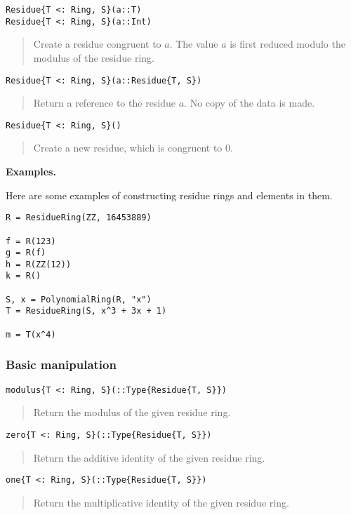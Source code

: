 \documentclass[a4paper,10pt]{article}
\newcommand{\desc}[1]{\vspace{-3mm}\begin{quote}#1\end{quote}}
\begin{document}
{{{\begin{lstlisting}
Residue{T <: Ring, S}(a::T)
Residue{T <: Ring, S}(a::Int)  
\end{lstlisting}

\desc{Create a residue congruent to $a$. The value $a$ is first reduced
modulo the modulus of the residue ring.}

\begin{lstlisting}
Residue{T <: Ring, S}(a::Residue{T, S})  
\end{lstlisting}

\desc{Return a reference to the residue $a$. No copy of the data is made.}

\begin{lstlisting}
Residue{T <: Ring, S}()
\end{lstlisting}

\desc{Create a new residue, which is congruent to $0$.}

\textbf{Examples.}

Here are some examples of constructing residue rings and elements in them.

\begin{lstlisting}
R = ResidueRing(ZZ, 16453889)

f = R(123)
g = R(f)
h = R(ZZ(12))
k = R()

S, x = PolynomialRing(R, "x")
T = ResidueRing(S, x^3 + 3x + 1)

m = T(x^4)
\end{lstlisting}

\subsubsection{Basic manipulation}

\begin{lstlisting}
modulus{T <: Ring, S}(::Type{Residue{T, S}})
\end{lstlisting}

\desc{Return the modulus of the given residue ring.}

\begin{lstlisting}
zero{T <: Ring, S}(::Type{Residue{T, S}})
\end{lstlisting}

\desc{Return the additive identity of the given residue ring.}

\begin{lstlisting}
one{T <: Ring, S}(::Type{Residue{T, S}})
\end{lstlisting}

\desc{Return the multiplicative identity of the given residue ring.}

}}}
\end{document}
